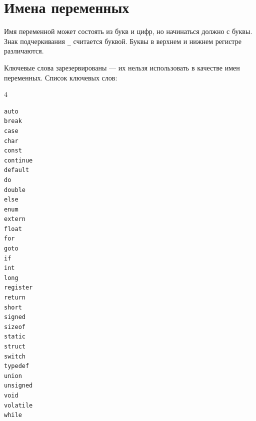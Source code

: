 \section{Имена переменных}

Имя переменной может состоять из букв и цифр, но начинаться должно с буквы.
Знак подчеркивания \texttt{\_} считается буквой.
Буквы в верхнем и нижнем регистре различаются.

Ключевые слова зарезервированы --- их нельзя использовать в качестве имен переменных.
Список ключевых слов:
\begin{multicols}{4}
\begin{verbatim}
auto
break
case
char
const
continue
default
do
double
else
enum
extern
float
for
goto
if
int
long
register
return
short
signed
sizeof
static
struct
switch
typedef
union
unsigned
void
volatile
while
\end{verbatim}
\end{multicols}

